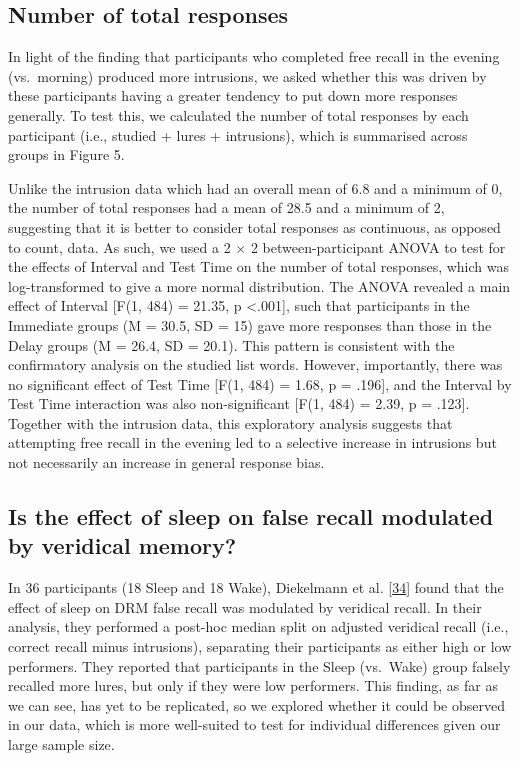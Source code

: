 \documentclass[
]{article}
\begin{document}
\hypertarget{number-of-total-responses}{%
\subsection{Number of total responses}\label{number-of-total-responses}}

In light of the finding that participants who completed free recall in the evening (vs.~morning) produced more intrusions, we asked whether this was driven by these participants having a greater tendency to put down more responses generally. To test this, we calculated the number of total responses by each participant (i.e., studied + lures + intrusions), which is summarised across groups in Figure 5.

Unlike the intrusion data which had an overall mean of 6.8 and a minimum of 0, the number of total responses had a mean of 28.5 and a minimum of 2, suggesting that it is better to consider total responses as continuous, as opposed to count, data. As such, we used a 2 \(\times\) 2 between-participant ANOVA to test for the effects of Interval and Test Time on the number of total responses, which was log-transformed to give a more normal distribution. The ANOVA revealed a main effect of Interval {[}F(1, 484) = 21.35, p \textless.001{]}, such that participants in the Immediate groups (M = 30.5, SD = 15) gave more responses than those in the Delay groups (M = 26.4, SD = 20.1). This pattern is consistent with the confirmatory analysis on the studied list words. However, importantly, there was no significant effect of Test Time {[}F(1, 484) = 1.68, p = .196{]}, and the Interval by Test Time interaction was also non-significant {[}F(1, 484) = 2.39, p = .123{]}. Together with the intrusion data, this exploratory analysis suggests that attempting free recall in the evening led to a selective increase in intrusions but not necessarily an increase in general response bias.

\hypertarget{is-the-effect-of-sleep-on-false-recall-modulated-by-veridical-memory}{%
\subsection{Is the effect of sleep on false recall modulated by veridical memory?}\label{is-the-effect-of-sleep-on-false-recall-modulated-by-veridical-memory}}

In 36 participants (18 Sleep and 18 Wake), Diekelmann et al. {[}\protect\hyperlink{ref-diekelmann2010a}{34}{]} found that the effect of sleep on DRM false recall was modulated by veridical recall. In their analysis, they performed a post-hoc median split on adjusted veridical recall (i.e., correct recall minus intrusions), separating their participants as either high or low performers. They reported that participants in the Sleep (vs.~Wake) group falsely recalled more lures, but only if they were low performers. This finding, as far as we can see, has yet to be replicated, so we explored whether it could be observed in our data, which is more well-suited to test for individual differences given our large sample size.
\end{document}
